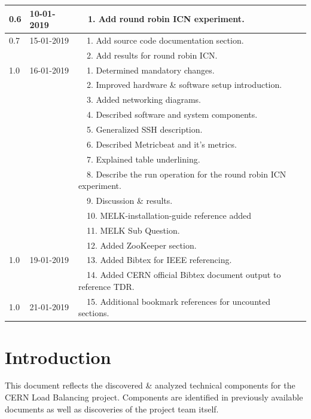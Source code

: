 \documentclass[]{article}
\newcommand{\tabitemNum}{~~}
\begin{document}
\begin{table}[H]
\begin{center}
\begin{tabularx}{\textwidth}{ | l | l | X | }
			\multirow{1}{*}{0.6} & 10-01-2019 & \tabitemNum 1. Add round robin ICN experiment. \\ \hline
			
			\multirow{1}{*}{0.7} & 15-01-2019 & \tabitemNum 1. Add source code documentation section. \\
			& & \tabitemNum 2. Add results for round robin ICN. \\ \hline
			
			\multirow{1}{*}{1.0} & 16-01-2019 & \tabitemNum 1. Determined mandatory changes. \\
			& & \tabitemNum 2. Improved hardware \& software setup introduction. \\
			& & \tabitemNum 3. Added networking diagrams. \\
			& & \tabitemNum 4. Described software and system components. \\
			& & \tabitemNum 5. Generalized SSH description. \\
			& & \tabitemNum 6. Described Metricbeat and it’s metrics. \\
			& & \tabitemNum 7. Explained table underlining. \\
			& & \tabitemNum 8. Describe the run operation for the round robin ICN experiment. \\
			& & \tabitemNum 9. Discussion \& results. \\
			& & \tabitemNum 10. MELK-installation-guide reference added \\
			& & \tabitemNum 11. MELK Sub Question. \\
			& & \tabitemNum 12. Added ZooKeeper section. \\ \hline
			\multirow{1}{*}{1.0} & 19-01-2019 & \tabitemNum 13. Added Bibtex for IEEE referencing. \\
			& & \tabitemNum 14. Added CERN official Bibtex document output to reference TDR. \\ \hline
			\multirow{1}{*}{1.0} & 21-01-2019 & \tabitemNum 15. Additional bookmark references for uncounted sections. \\ \hline
		\end{tabularx}
	\end{center}
\end{table}
\newpage

\tableofcontents{}
\newpage

\section*{Introduction}
This document reflects the discovered \& analyzed technical components for the CERN Load Balancing project. Components are identified in previously available documents as well as discoveries of the project team itself. 
\end{document}
